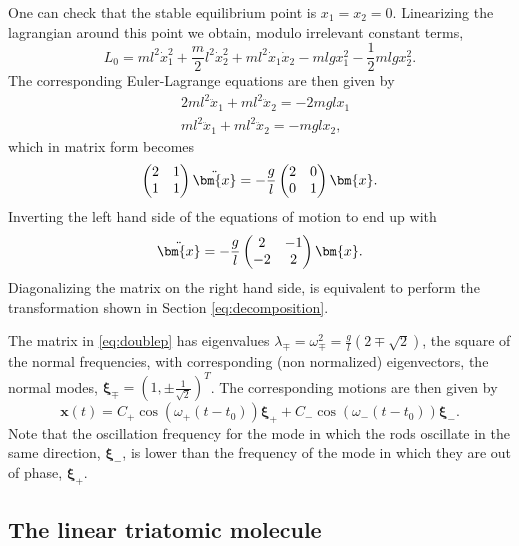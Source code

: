 \documentclass[english,fontsize=11pt,paper=a5,oneside]{scrbook}
\newcommand{\bx}{\bm{x}}
\theoremstyle{definition}
\begin{document}
One can check that the stable equilibrium point is $x_1 = x_2 = 0$.
Linearizing the lagrangian around this point we obtain, modulo irrelevant constant terms,
\begin{equation}
    L_0 = m l^2 \dot x_1^2
    + \frac m2 l^2 \dot x_2^2
    + m l^2 \dot x_1 \dot x_2
    - ml g x_1^2
    - \frac12 mlg x_2^2.
\end{equation}
The corresponding Euler-Lagrange equations are then given by
\begin{align}
    &2ml^2 \ddot x_1 + ml^2 \ddot x_2 = -2mgl x_1\\
    &ml^2 \ddot x_1 + ml^2 \ddot x_2 = -mgl x_2,
\end{align}
which in matrix form becomes
\begin{equation}
\begin{pmatrix}2&1\\1&1\end{pmatrix} \ddot\bx
    = - \frac gl \begin{pmatrix}2&0\\0&1\end{pmatrix} \bx.
\end{equation}
Inverting the left hand side of the equations of motion to end up with
\begin{equation}\label{eq:doublep}
    \ddot \bx = - \frac gl \begin{pmatrix}2&-1\\-2&2\end{pmatrix} \bx.
\end{equation}
Diagonalizing the matrix on the right hand side, is equivalent to perform the transformation shown in Section \ref{eq:decomposition}.

The matrix in \eqref{eq:doublep} has eigenvalues $\lambda_\mp = \omega_\mp^2 = \frac{g}l \left(2\mp \sqrt{2}\right)$, the square of the normal frequencies, with corresponding (non normalized) eigenvectors, the normal modes, $\bm{\xi}_\mp = \left(1, \pm \frac1{\sqrt{2}}\right)^T$.
The corresponding motions are then given by
\begin{equation}
    \bx(t) = C_+  \cos (\omega_+ (t - t_0)) \bm{\xi}_+ + C_- \cos (\omega_- (t - t_0)) \bm{\xi}_-.
\end{equation}
Note that the oscillation frequency for the mode in which the rods oscillate in the same direction, $\bm{\xi}_-$, is lower than the frequency of the mode in which they are out of phase, $\bm{\xi}_+$.

\subsection{The linear triatomic molecule}\label{sec:triatomic}
\end{document}
